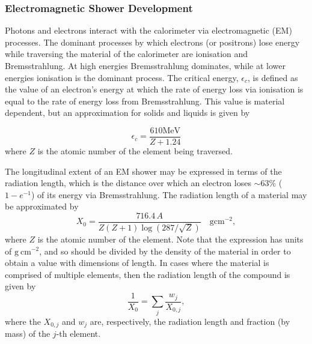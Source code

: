 

\subsubsection{Electromagnetic Shower Development}

Photons and electrons interact with the calorimeter via electromagnetic (EM) processes. The dominant processes by which electrons (or positrons) lose energy while traversing the material of the calorimeter are ionisation and Bremsstrahlung. At high energies Bremsstrahlung dominates, while at lower energies ionisation is the dominant process. The critical energy, $\epsilon_c$, is defined as the value of an electron's energy at which the rate of energy loss via ionisation is equal to the rate of energy loss from Bremsstrahlung. This value  is material dependent, but an approximation for solids and liquids is given by\cite{wigmans2000calorimetry}

\begin{equation}
\epsilon_c = \frac{610 \mathrm{MeV}}{Z + 1.24}
\end{equation}
where $Z$ is the atomic number of the element being traversed.

The longitudinal extent of an EM shower may be expressed in terms of the radiation length, which is the distance over which an electron loses $\sim63\%$  ($1- e^{-1}$) of its energy via Bremsstrahlung. The radiation length of a material may be approximated by\cite{ReviewPP98}
\begin{equation}
X_0 = \frac{716.4 \,A }{Z(Z+1) \log(287/\sqrt{Z})} \quad \mathrm{g cm}^{-2},
\end{equation}
where $Z$ is the atomic number of the element. Note that the expression has units of $\mathrm{g~cm}^{-2}$, and so should be divided by the density of the material in order to obtain a value with dimensions of length. In cases where the material is comprised of multiple elements, then the radiation length of the compound is given by
\begin{equation}
\frac{1}{X_0} = \sum_j \frac{w_j}{X_{0,j}},
\end{equation}
where the $X_{0,j}$ and $w_j$ are, respectively, the radiation length and fraction (by mass) of the $j$-th element.

